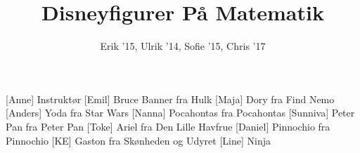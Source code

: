 \documentclass[a4paper,11pt]{article}
\title{Disneyfigurer På Matematik}
\author{Erik '15, Ulrik '14, Sofie '15, Chris '17}
\begin{document}
\maketitle

\begin{roles}
[Anne] Instruktør
[Emil] Bruce Banner fra Hulk
[Maja] Dory fra Find Nemo
[Anders] Yoda fra Star Wars
[Nanna] Pocahontas fra Pocahontas
[Sunniva] Peter Pan fra Peter Pan
[Toke] Ariel fra Den Lille Havfrue
[Daniel] Pinnochio fra Pinnochio
[KE] Gaston fra Skønheden og Udyret
[Line] Ninja
\end{roles}

\begin{props}
\end{props}
\end{document}
